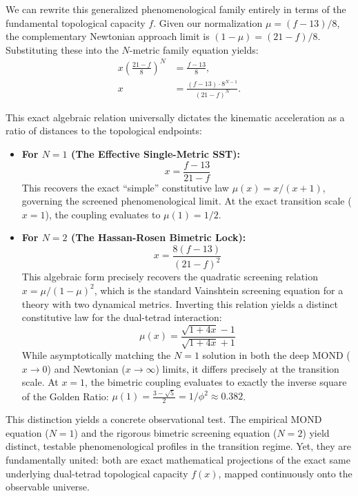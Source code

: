 \documentclass[twocolumn]{iopjournal}
\begin{document}
We can rewrite this generalized phenomenological family entirely in terms of the fundamental topological capacity $f$. Given our normalization $\mu = (f - 13)/8$, the complementary Newtonian approach limit is $(1 - \mu) = (21 - f)/8$. Substituting these into the $N$-metric family equation yields:
\begin{align}
x \left( \frac{21 - f}{8} \right)^{\!N} &= \frac{f - 13}{8}, \nonumber \\
x &= \frac{(f - 13)\cdot 8^{N-1}}{(21 - f)^N}.
\end{align}

This exact algebraic relation universally dictates the kinematic acceleration as a ratio of distances to the topological endpoints:
\begin{itemize}
    \item \textbf{For $N = 1$ (The Effective Single-Metric SST):} 
    \begin{equation}
    x = \frac{f - 13}{21 - f}
    \end{equation}
    This recovers the exact ``simple'' constitutive law $\mu(x) = x/(x+1)$, governing the screened phenomenological limit. At the exact transition scale ($x=1$), the coupling evaluates to $\mu(1) = 1/2$.
    
    \item \textbf{For $N = 2$ (The Hassan-Rosen Bimetric Lock):} 
    \begin{equation}
    x = \frac{8(f - 13)}{(21 - f)^2}
    \end{equation}
    This algebraic form precisely recovers the quadratic screening relation $x = \mu/(1 - \mu)^2$, which is the standard Vainshtein screening equation for a theory with two dynamical metrics. Inverting this relation yields a distinct constitutive law for the dual-tetrad interaction:
    \begin{equation}
    \mu(x) = \frac{\sqrt{1+4x}-1}{\sqrt{1+4x}+1}
    \end{equation}
    While asymptotically matching the $N=1$ solution in both the deep MOND ($x \to 0$) and Newtonian ($x \to \infty$) limits, it differs precisely at the transition scale. At $x=1$, the bimetric coupling evaluates to exactly the inverse square of the Golden Ratio: $\mu(1) = \frac{3-\sqrt{5}}{2} = 1/\phi^2 \approx 0.382$.
\end{itemize}

This distinction yields a concrete observational test. The empirical MOND equation ($N=1$) and the rigorous bimetric screening equation ($N=2$) yield distinct, testable phenomenological profiles in the transition regime. Yet, they are fundamentally united: both are exact mathematical projections of the exact same underlying dual-tetrad topological capacity $f(x)$, mapped continuously onto the observable universe.
\end{document}
